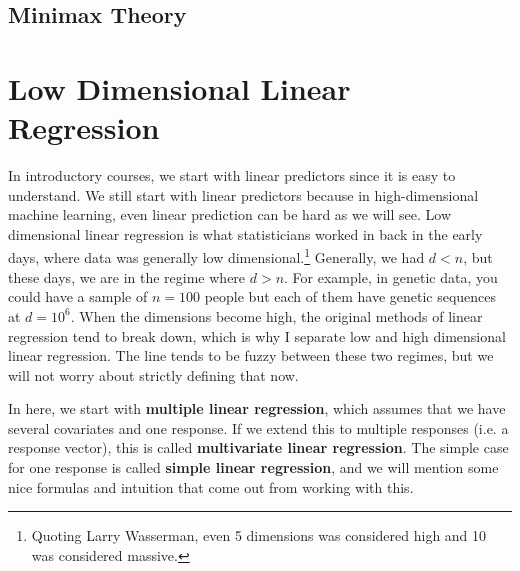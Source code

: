 \documentclass{article}
\begin{document}
  \subsection{Minimax Theory}

\section{Low Dimensional Linear Regression}

    In introductory courses, we start with linear predictors since it is easy to understand. We still start with linear predictors because in high-dimensional machine learning, even linear prediction can be hard as we will see. Low dimensional linear regression is what statisticians worked in back in the early days, where data was generally low dimensional.\footnote{Quoting Larry Wasserman, even 5 dimensions was considered high and 10 was considered massive. } Generally, we had $d < n$, but these days, we are in the regime where $d > n$. For example, in genetic data, you could have a sample of $n = 100$ people but each of them have genetic sequences at $d = 10^6$. When the dimensions become high, the original methods of linear regression tend to break down, which is why I separate low and high dimensional linear regression. The line tends to be fuzzy between these two regimes, but we will not worry about strictly defining that now. 

    In here, we start with \textbf{multiple linear regression}, which assumes that we have several covariates and one response. If we extend this to multiple responses (i.e. a response vector), this is called \textbf{multivariate linear regression}. The simple case for one response is called \textbf{simple linear regression}, and we will mention some nice formulas and intuition that come out from working with this. 
\end{document}
